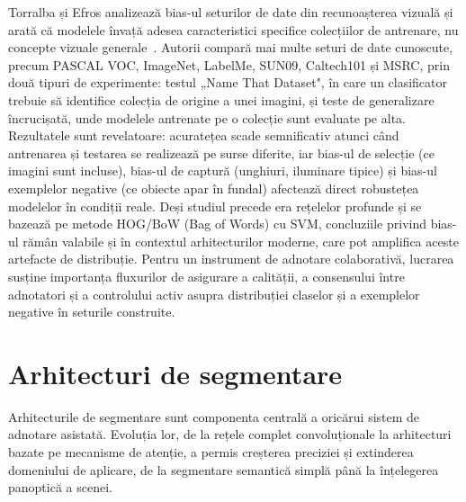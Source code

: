 Torralba și Efros analizează bias-ul seturilor de date din recunoașterea vizuală și arată că modelele învață adesea caracteristici specifice colecțiilor de antrenare, nu concepte vizuale generale~\cite{5995347}. Autorii compară mai multe seturi de date cunoscute, precum PASCAL VOC, ImageNet, LabelMe, SUN09, Caltech101 și MSRC, prin două tipuri de experimente: testul „Name That Dataset", în care un clasificator trebuie să identifice colecția de origine a unei imagini, și teste de generalizare încrucișată, unde modelele antrenate pe o colecție sunt evaluate pe alta. Rezultatele sunt revelatoare: acuratețea scade semnificativ atunci când antrenarea și testarea se realizează pe surse diferite, iar bias-ul de selecție (ce imagini sunt incluse), bias-ul de captură (unghiuri, iluminare tipice) și bias-ul exemplelor negative (ce obiecte apar în fundal) afectează direct robustețea modelelor în condiții reale. Deși studiul precede era rețelelor profunde și se bazează pe metode HOG/BoW (Bag of Words) cu SVM, concluziile privind bias-ul rămân valabile și în contextul arhitecturilor moderne, care pot amplifica aceste artefacte de distribuție. Pentru un instrument de adnotare colaborativă, lucrarea susține importanța fluxurilor de asigurare a calității, a consensului între adnotatori și a controlului activ asupra distribuției claselor și a exemplelor negative în seturile construite.

\section{Arhitecturi de segmentare}

Arhitecturile de segmentare sunt componenta centrală a oricărui sistem de adnotare asistată. Evoluția lor, de la rețele complet convoluționale la arhitecturi bazate pe mecanisme de atenție, a permis creșterea preciziei și extinderea domeniului de aplicare, de la segmentare semantică simplă până la înțelegerea panoptică a scenei.

